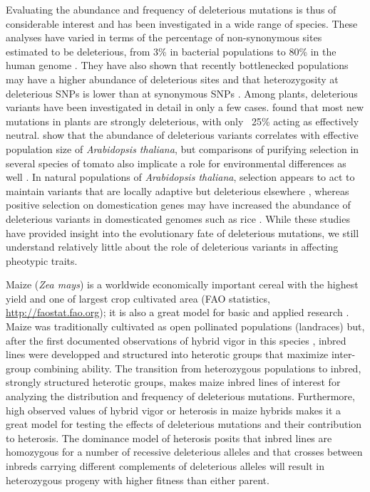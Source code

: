 \documentclass[12pt]{article}
\begin{document}
Evaluating the abundance and frequency of deleterious mutations is thus of considerable interest and has been investigated in a wide range of species. These analyses have varied in terms of the percentage of non-synonymous sites estimated to be deleterious, from 3\% in bacterial populations \citep{Hughes2005} to 80\% in the human genome \citep{Fay2001}. They have also shown that recently bottlenecked populations may have a higher abundance of deleterious sites and that heterozygosity at deleterious SNPs is lower than at synonymous SNPs \citep{Lohmueller2008}.
Among plants, deleterious variants have been investigated in detail in only a few cases. \citet{Gossmann2010} found that most new mutations in plants are strongly deleterious, with only ~25\% acting as effectively neutral. \citet{Cao2011} show that the abundance of deleterious variants correlates with effective population size of \emph{Arabidopsis thaliana}, but comparisons of purifying selection in several species of tomato also implicate a role for environmental differences as well \citep{Tellier2011}. In natural populations of \emph{Arabidopsis thaliana}, selection appears to act to maintain variants that are locally adaptive but deleterious elsewhere \citep{Fournier-Level2011}, whereas positive selection on domestication genes may have increased the abundance of deleterious variants in domesticated genomes such as rice \citep{Gunther2010, Lu2006}. While these studies have provided insight into the evolutionary fate of deleterious mutations, we still understand relatively little about the role of deleterious variants in affecting pheotypic traits. 

Maize (\emph{Zea mays}) is a worldwide economically important cereal with the highest yield and one of largest crop cultivated area (FAO statistics, \url{http://faostat.fao.org}); it is also a great model for basic and applied research \citep{Strable2009}. Maize was traditionally cultivated as open pollinated populations (landraces) but, after the first documented observations of hybrid vigor in this species \citep{East1908,Shull1908}, inbred lines were developped and structured into heterotic groups that maximize inter-group combining ability. 
The transition from heterozygous populations to inbred, strongly structured heterotic groups, makes maize inbred lines of interest for analyzing the distribution and frequency of deleterious mutations. Furthermore, high observed values of hybrid vigor or heterosis in maize hybrids makes it a great model for testing the effects of deleterious mutations and their contribution to heterosis.  The dominance model of heterosis posits that inbred lines are homozygous for a number of recessive deleterious alleles and that crosses between inbreds carrying different complements of deleterious alleles will result in heterozygous progeny with higher fitness than either parent.
\end{document}
